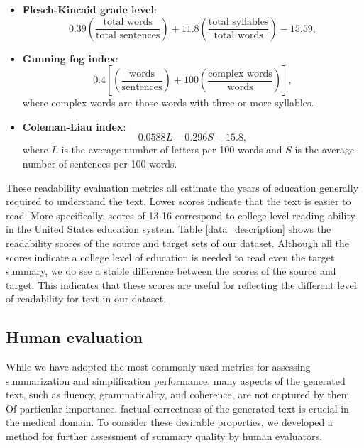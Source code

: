 \documentclass[letterpaper, table]{article} %
\begin{document}
\begin{itemize}
    \item \textbf{Flesch-Kincaid grade level}:
    $$0.39 \left (\frac{\mbox{total words}}{\mbox{total sentences}}\right ) + 11.8 \left (\frac{\mbox{total syllables}}{\mbox{total words}} \right ) - 15.59,$$
    \item \textbf{Gunning fog index}:
    $$0.4\left[\left(\frac{\mbox{words}}{\mbox{sentences}}\right ) +100\left (\frac{\mbox{complex words}}{\mbox{words}}\right)\right],$$
    where complex words are those words with three or more syllables.
    \item \textbf{Coleman-Liau index}:
    $$0.0588L - 0.296S - 15.8,$$
    where $L$ is the average number of letters per 100 words and $S$ is the average number of sentences per 100 words.
\end{itemize}
    These readability evaluation metrics all estimate the years of education generally required to understand the text. Lower scores indicate that the text is easier to read.
    More specifically, scores of 13-16 correspond to college-level reading ability in the United States education system. Table \ref{data_description} shows the readability scores of the source and target sets of our dataset. Although all the scores indicate a college level of education is needed to read even the target summary, we do see a stable difference between the scores of the source and target. This indicates that these scores are useful for reflecting the different level of readability for text in our dataset.
\subsection{Human evaluation}
While we have adopted the most commonly used metrics for assessing summarization and simplification performance, many aspects of the generated text, such as fluency, grammaticality, and coherence, are not captured by them. Of particular importance, factual correctness of the generated text is crucial in the medical domain. To consider these desirable properties, we developed a method for further assessment of summary quality by human evaluators.
\end{document}
